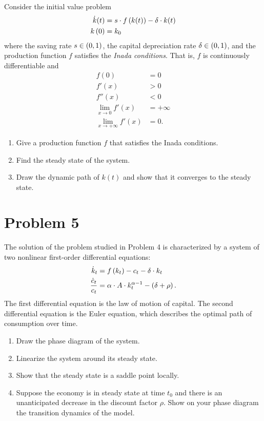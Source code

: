 \documentclass[letterpaper,12pt,leqno]{article}
\begin{document}
Consider the initial value problem 
\begin{align*}
\dot{k}(t) &=s\cdot f\left( k(t) \right) -\delta\cdot  k(t) \\
k\left( 0 \right) &=k_{0}
\end{align*}
where the saving rate $s\in \left( 0,1 \right) $, the capital depreciation rate $\delta \in \left( 0,1 \right)$, and the production function $f$ satisfies the \textit{Inada conditions}. That is, $f$ is continuously differentiable and 
\begin{align*}
f(0)&=0\\
f'(x)&>0\\
f''(x)&<0\\
\lim_{x\to 0} f'(x)&=+\infty\\
\lim_{x\to +\infty} f'(x)&=0.
\end{align*}

\begin{enumerate}
\item Give a production function $f$ that satisfies the Inada conditions.
\item Find the steady state of the system.
\item Draw the dynamic path of $k(t) $ and show that it converges to the steady state.
\end{enumerate}

\section*{Problem 5}

The solution of the problem studied in Problem 4 is characterized by a system of two nonlinear first-order differential equations:
\begin{align*}
\dot{k}_{t} &=f\left( k_{t} \right) -c_{t}-\delta \cdot k_{t}\\
\frac{\dot{c}_{t}}{c_{t}} &=\alpha \cdot  A \cdot k_{t}^{\alpha -1}-\left( \delta +\rho \right).
\end{align*}
The first differential equation is the law of motion of capital. The second differential equation is the Euler equation, which describes the optimal path of consumption over time.


\begin{enumerate}
\item Draw the phase diagram of the system.
\item Linearize the system around its steady state.
\item Show that the steady state is a saddle point  locally.
\item Suppose the economy is in steady state at time $t_{0}$ and there is an unanticipated decrease in the discount factor $\rho$. Show on your phase diagram the transition dynamics of the model.
\end{enumerate}
\end{document}

